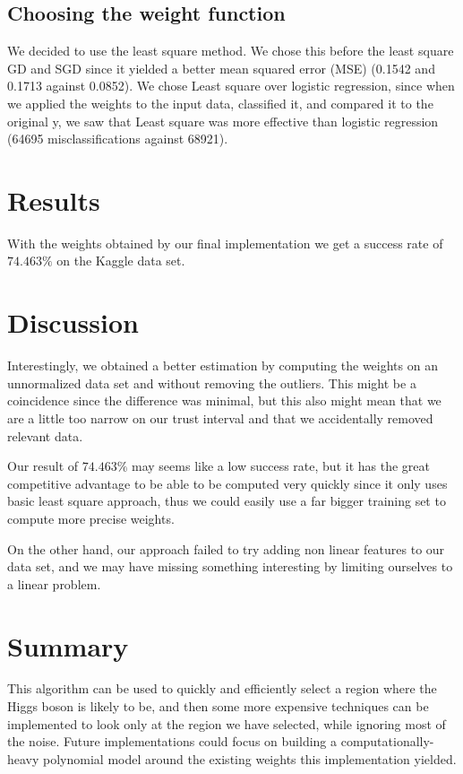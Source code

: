 \documentclass[10pt,conference,compsocconf]{IEEEtran}
\begin{document}
\subsection{Choosing the weight function} We decided to use the least square method. We chose this before the least square GD and SGD since it yielded a better mean squared error (MSE) (0.1542 and 0.1713 against 0.0852). We chose Least square over logistic regression, since when we applied the weights to the input data, classified it, and compared it to the original y, we saw that Least square was more effective than logistic regression (64695 misclassifications against 68921).
\section{Results}
With the weights obtained by our final implementation we get a success rate of $74.463\%$ on the Kaggle data set.

\section{Discussion}
Interestingly, we obtained a better estimation by computing the weights on an unnormalized data set and without removing the outliers. This might be a coincidence since the difference was minimal, but this also might mean that we are a little too narrow on our trust interval and that we accidentally removed relevant data.

Our result of $74.463\%$ may seems like a low success rate, but it has the great competitive advantage to be able to be computed very quickly since it only uses basic least square approach, thus we could easily use a far bigger training set to compute more precise weights.

On the other hand, our approach failed to try adding non linear features to our data set, and we may have missing something interesting by limiting ourselves to a linear problem.

\section{Summary}
This algorithm can be used to quickly and efficiently select a region where the Higgs boson is likely to be, and then some more expensive techniques can be implemented to look only at the region we have selected, while ignoring most of the noise. Future implementations could focus on building a computationally-heavy polynomial model around the existing weights this implementation yielded.



\end{document}
